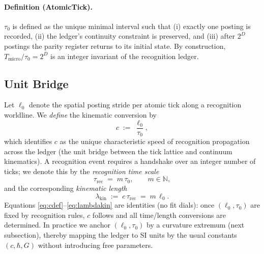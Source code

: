 \documentclass[11pt]{article}
\theoremstyle{definition}
\theoremstyle{remark}
\begin{document}
\paragraph{Definition (AtomicTick).}
$\tau_0$ is defined as the unique minimal interval such that (i) exactly one posting is recorded, (ii) the ledger’s continuity constraint is preserved, and (iii) after $2^D$ postings the parity register returns to its initial state. By construction, $T_{\mathrm{micro}}/\tau_0=2^D$ is an integer invariant of the recognition ledger.

\subsection{Unit Bridge}
Let $\ell_0$ denote the spatial posting stride per atomic tick along a recognition worldline. We \emph{define} the kinematic conversion by
\begin{equation}
\label{eq:cdef}
c \;:=\; \frac{\ell_0}{\tau_0},
\end{equation}
which identifies $c$ as the unique characteristic speed of recognition propagation across the ledger (the unit bridge between the tick lattice and continuum kinematics). A recognition event requires a handshake over an integer number of ticks; we denote this by the \emph{recognition time scale}
\begin{equation}
\label{eq:taurec}
\tau_{\mathrm{rec}} \;=\; m\,\tau_0,\qquad m\in\mathbb{N},
\end{equation}
and the corresponding \emph{kinematic length}
\begin{equation}
\label{eq:lambdakin}
\lambda_{\mathrm{kin}} \;:=\; c\,\tau_{\mathrm{rec}} \;=\; m\,\ell_0.
\end{equation}
Equations \eqref{eq:cdef}--\eqref{eq:lambdakin} are identities (no fit dials): once $(\ell_0,\tau_0)$ are fixed by recognition rules, $c$ follows and all time/length conversions are determined. In practice we anchor $(\ell_0,\tau_0)$ by a curvature extremum (next subsection), thereby mapping the ledger to SI units by the usual constants $(c,\hbar,G)$ without introducing free parameters.
\end{document}
